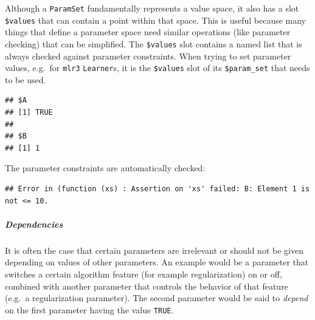 \documentclass[]{article}
\newenvironment{Shaded}{\begin{snugshade}}{\end{snugshade}}
\newcommand{\DataTypeTok}[1]{\textcolor[rgb]{0.13,0.29,0.53}{#1}}
\newcommand{\DecValTok}[1]{\textcolor[rgb]{0.00,0.00,0.81}{#1}}
\newcommand{\KeywordTok}[1]{\textcolor[rgb]{0.13,0.29,0.53}{\textbf{#1}}}
\newcommand{\NormalTok}[1]{#1}
\newcommand{\OperatorTok}[1]{\textcolor[rgb]{0.81,0.36,0.00}{\textbf{#1}}}
\newcommand{\OtherTok}[1]{\textcolor[rgb]{0.56,0.35,0.01}{#1}}
\newcommand{\StringTok}[1]{\textcolor[rgb]{0.31,0.60,0.02}{#1}}
\let\oldsubparagraph\subparagraph
\renewcommand{\subparagraph}[1]{\oldsubparagraph{#1}\mbox{}}
\renewenvironment{Shaded} {\begin{snugshade}\small} {\end{snugshade}}
\begin{document}
Although a \texttt{ParamSet} fundamentally represents a value space, it also has a slot \texttt{\$values} that can contain a point within that space.
This is useful because many things that define a parameter space need similar operations (like parameter checking) that can be simplified.
The \texttt{\$values} slot contains a named list that is always checked against parameter constraints.
When trying to set parameter values, e.g.~for \texttt{mlr3} \texttt{Learner}s, it is the \texttt{\$values} slot of its \texttt{\$param\_set} that needs to be used.

\begin{Shaded}
\end{Shaded}

\begin{verbatim}
## $A
## [1] TRUE
## 
## $B
## [1] 1
\end{verbatim}

The parameter constraints are automatically checked:

\begin{Shaded}
\end{Shaded}

\begin{verbatim}
## Error in (function (xs) : Assertion on 'xs' failed: B: Element 1 is not <= 10.
\end{verbatim}

\hypertarget{dependencies}{%
\subparagraph{Dependencies}\label{dependencies}}

It is often the case that certain parameters are irrelevant or should not be given depending on values of other parameters.
An example would be a parameter that switches a certain algorithm feature (for example regularization) on or off, combined with another parameter that controls the behavior of that feature (e.g.~a regularization parameter).
The second parameter would be said to \emph{depend} on the first parameter having the value \texttt{TRUE}.
\end{document}
